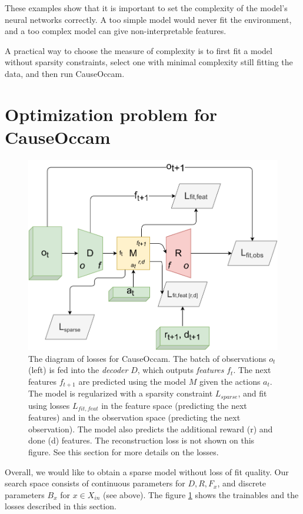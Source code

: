 \documentclass[a4paper,11pt,oneside]{report}
\newcommand{\sysname}{CauseOccam\xspace}
\begin{document}
These examples show that it is important to set the complexity of the model's neural networks correctly. A too simple model would never fit the environment, and a too complex model can give non-interpretable features.

A practical way to choose the measure of complexity is to first fit a model without sparsity constraints, select one with minimal complexity still fitting the data, and then run \sysname.

\section{Optimization problem for \sysname}
\begin{figure}[h]
    \centering
    \includegraphics[width=0.7\linewidth]{diagrams/architecture_losses}
    \caption{The diagram of losses for \sysname. The batch of observations $o_t$ (left) is fed into the {\em decoder} $D$, which outputs {\em features} $f_t$. The next features $f_{t+1}$ are predicted using the model $M$ given the actions $a_t$. The model is regularized with a sparsity constraint $L_{sparse}$, and fit using losses $L_{fit,feat}$ in the feature space (predicting the next features) and in the observation space (predicting the next observation). The model also predicts the additional reward (r) and done (d) features. The reconstruction loss is not shown on this figure. See this section for more details on the losses.}
    \label{fig:architecture_losses}
\end{figure}


Overall, we would like to obtain a sparse model without loss of fit quality. Our search space consists of continuous parameters for $D,R,F_x$, and discrete parameters $B_x$ for $x\in X_{in}$ (see above). The figure \ref{fig:architecture_losses} shows the trainables and the losses described in this section.
\end{document}
